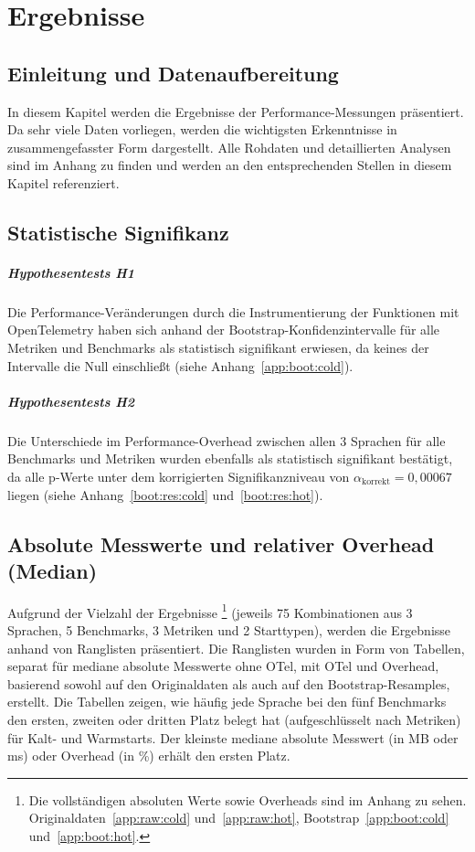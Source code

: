 \chapter{Ergebnisse}
\label{ch:chapter05}

\section{Einleitung und Datenaufbereitung}
In diesem Kapitel werden die Ergebnisse der Performance-Messungen präsentiert. Da sehr viele Daten vorliegen, werden die wichtigsten 
Erkenntnisse in zusammengefasster Form dargestellt. Alle Rohdaten und detaillierten Analysen sind im Anhang zu finden und werden an den 
entsprechenden Stellen in diesem Kapitel referenziert.

\section{Statistische Signifikanz}
\paragraph[short]{Hypothesentests H1}
Die Performance-Veränderungen durch die Instrumentierung der Funktionen mit OpenTelemetry haben sich anhand der 
Bootstrap-Konfidenzintervalle für alle Metriken und Benchmarks als statistisch signifikant erwiesen, da keines 
der Intervalle die Null einschließt (siehe Anhang~\ref{app:boot:cold}).

\paragraph[short]{Hypothesentests H2}
Die Unterschiede im Performance-Overhead zwischen allen 3 Sprachen für alle Benchmarks und Metriken wurden ebenfalls als 
statistisch signifikant bestätigt, da alle p-Werte unter dem korrigierten Signifikanzniveau von 
\(\alpha_{\text{korrekt}} = 0{,}00067\) liegen (siehe Anhang~\ref{boot:res:cold} und~\ref{boot:res:hot}).

\section{Absolute Messwerte und relativer Overhead (Median)}
Aufgrund der Vielzahl der Ergebnisse \footnote{Die vollständigen absoluten Werte sowie Overheads sind im Anhang zu sehen. Originaldaten~\ref{app:raw:cold} und~\ref{app:raw:hot}, Bootstrap~\ref{app:boot:cold} und~\ref{app:boot:hot}.} (jeweils 75 Kombinationen aus 
3 Sprachen, 5 Benchmarks, 3 Metriken und 2 Starttypen), werden die Ergebnisse anhand von Ranglisten präsentiert. Die Ranglisten 
wurden in Form von Tabellen, separat für mediane absolute Messwerte ohne OTel, mit OTel und Overhead, basierend sowohl auf den 
Originaldaten als auch auf den Bootstrap-Resamples, erstellt. 
Die Tabellen zeigen, 
wie häufig jede Sprache bei den fünf Benchmarks den ersten, zweiten oder dritten Platz belegt hat (aufgeschlüsselt nach 
Metriken) für Kalt- und Warmstarts. Der kleinste mediane absolute Messwert (in MB oder ms) oder Overhead (in \%) erhält den ersten Platz. 

